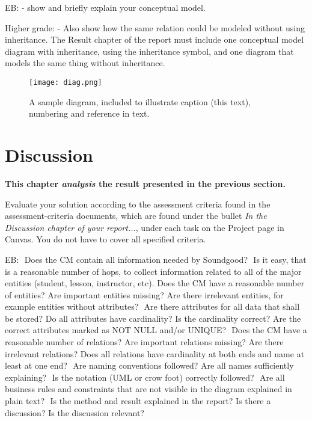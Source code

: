 \documentclass[a4paper]{scrartcl}
\begin{document}
EB:
- show and briefly explain your conceptual model.

Higher grade: 
- Also show how the same relation could be modeled without using inheritance. The Result chapter of the report must include one conceptual model diagram with inheritance, using the inheritance symbol, and one diagram that models the same thing without inheritance. 


\begin{figure}[h!]
  \begin{center}
    \texttt{[image: diag.png]}
    \caption{A sample diagram, included to illustrate caption (this text), numbering and reference in text.}
    \label{fig:diag}
  \end{center}
\end{figure}

\pagebreak

\section{Discussion}

\textbf{This chapter \textit{analysis} the result presented in the previous section.} 

Evaluate your solution according to the assessment criteria found in the assessment-criteria documents, which are found under the bullet \textit{In the Discussion chapter of your report...}, under each task on the Project page in Canvas. You do not have to cover all specified criteria.

EB:
 Does the CM contain all information needed by Soundgood?
 Is it easy, that is a reasonable number of hops, to collect information related to all of the major entities (student, lesson, instructor, etc).
 Does the CM have a reasonable number of entities? Are important entities missing? Are there irrelevant entities, for example entities without attributes?
 Are there attributes for all data that shall be stored? Do all attributes have cardinality? Is the cardinality correct? Are the correct attributes marked as NOT NULL and/or UNIQUE?
 Does the CM have a reasonable number of relations? Are important relations missing? Are there irrelevant relations? Does all relations have cardinality at both ends and name at least at one end?
 Are naming conventions followed? Are all names sufficiently explaining?
 Is the notation (UML or crow foot) correctly followed?
 Are all business rules and constraints that are not visible in the diagram explained in plain text?
 Is the method and result explained in the report? Is there a discussion? Is the discussion relevant?
\end{document}
